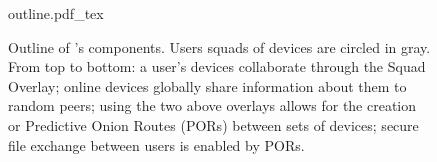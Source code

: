 

\begin{figure}[t]
\centering
\def\svgwidth{0.8\columnwidth}
%
{outline.pdf_tex}
\caption{\label{fig:outline}Outline of \name's components. Users squads of devices are circled in gray. From top to bottom: a user's devices collaborate through the Squad Overlay; online devices globally share information about them to random peers; using the two above overlays allows for the creation or Predictive Onion Routes (PORs) between sets of devices; secure file exchange between users is enabled by PORs.}
\end{figure}

